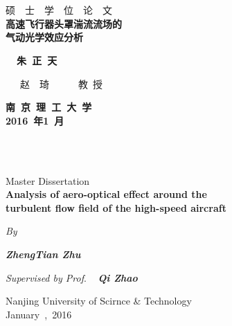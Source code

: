 {
\thispagestyle{empty}
\begin{minipage}{\textwidth}
\quad\\\quad\\
\end{minipage}
\begin{center}
{\fontsize{20pt}{\baselineskip}\selectfont {} 硕~~士~~学~~位~~论~~文}\\\vspace{6em}	
{\fontsize{21pt}{\baselineskip}\selectfont\bfseries 
高速飞行器头罩湍流流场的\\\vspace{.8em}气动光学效应分析}\\\vspace{8em}
\end{center}
{\fontsize{18pt}{\baselineskip}\selectfont\bf
\hspace{.25\textwidth}~~朱~正~天
\par\vspace{1em}\noindent
\hspace{.25\textwidth}~~~赵~~琦~~~~~~教~授
}\par\vfill
\begin{center}
\fontsize{18pt}{\baselineskip}\selectfont\bf 南~京~理~工~大~学\\
	2016~年1~月\\
\end{center} 
\vspace{4em}
}
\newpage %
{
\thispagestyle{empty}
\begin{minipage}{\textwidth}
		\quad\\\quad\\
\end{minipage}
\begin{center}
\fontsize{18pt}{\baselineskip}\selectfont
{ Master Dissertation}\\\vspace{3.5em}
{\fontsize{21pt}{\baselineskip}\selectfont\bfseries 
Analysis of aero-optical effect around the\\\vspace{1.1em}
turbulent flow field of the high-speed aircraft}
\vspace{3em}\par
\emph{By}\par \vspace{1.2em}\emph{\bf ZhengTian Zhu} \par \vspace{1.5em}
\emph{Supervised by Prof}.\emph{\bf~~Qi Zhao}
\par \vfill
Nanjing University of Scirnce \& Technology\\
January~,~2016\\
\end{center}
\vspace{4em}
}
